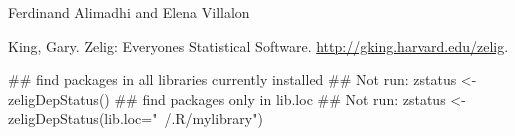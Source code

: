 \begin{Author}\relax
Ferdinand Alimadhi and Elena Villalon
\end{Author}
\begin{References}\relax
King, Gary. Zelig: Everyones Statistical Software. 
\url{http://gking.harvard.edu/zelig}.
\end{References}
\begin{SeeAlso}\relax
{}
\end{SeeAlso}
\begin{Examples}
\begin{ExampleCode}
## find packages in all libraries currently installed
## Not run: zstatus <- zeligDepStatus()
## find packages only in lib.loc
## Not run: zstatus <- zeligDepStatus(lib.loc="~/.R/mylibrary")
\end{ExampleCode}
\end{Examples}


